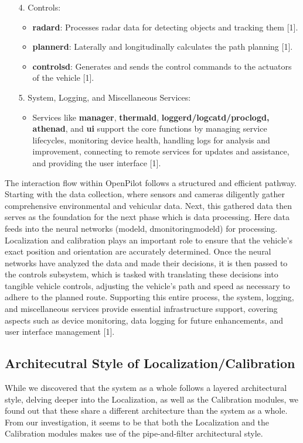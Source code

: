 \documentclass[12pt]{article}
\begin{document}
\begin{itemize}
    \item[4. ] Controls:
        \begin{itemize}
            \item \textbf{radard}: Processes radar data for detecting objects and tracking them [1].
            \item \textbf{plannerd}: Laterally and longitudinally calculates the path planning [1].
            \item \textbf{controlsd}: Generates and sends the control commands to the actuators of the vehicle [1].
        \end{itemize}
    \item[5. ] System, Logging, and Miscellaneous Services:
        \begin{itemize}
            \item Services like \textbf{manager}, \textbf{thermald}, \textbf{loggerd/logcatd/proclogd, athenad}, and \textbf{ui} support the core functions by managing service lifecycles, monitoring device health, handling logs for analysis and improvement, connecting to remote services for updates and assistance, and providing the user interface [1].
        \end{itemize}
\end{itemize}
The interaction flow within OpenPilot follows a structured and efficient pathway. Starting with the data collection, where sensors and cameras diligently gather comprehensive environmental and vehicular data. Next, this gathered data then serves as the foundation for the next phase which is data processing. Here data feeds into the neural networks (modeld, dmonitoringmodeld) for processing. Localization and calibration plays an important role to ensure that the vehicle's exact position and orientation are accurately determined.  Once the neural networks have analyzed the data and made their decisions, it is then passed to the controls subsystem, which is tasked with translating these decisions into tangible vehicle controls, adjusting the vehicle's path and speed as necessary to adhere to the planned route. Supporting this entire process, the system, logging, and miscellaneous services provide essential infrastructure support, covering aspects such as device monitoring, data logging for future enhancements, and user interface management [1].




    


\subsection{Architecutral Style of Localization/Calibration}
While we discovered that the system as a whole follows a layered architectural style, delving deeper into the Localization, as well as the Calibration modules, we found out that these share a different architecture than the system as a whole. From our investigation, it seems to be that both the Localization and the Calibration modules makes use of the pipe-and-filter architectural style.
\end{document}
